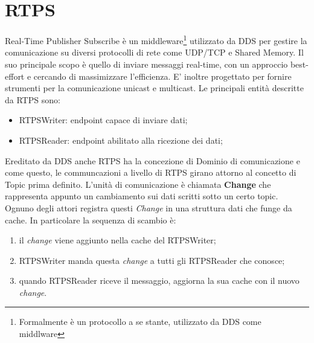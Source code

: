 \section{RTPS}
Real-Time Publisher Subscribe è un middleware\footnote{Formalmente è un protocollo a se stante, utilizzato da DDS come middlware} utilizzato da DDS per gestire la comunicazione su diversi protocolli di rete come UDP/TCP e Shared Memory. Il suo principale scopo è quello di inviare messaggi real-time, con un approccio best-effort e cercando di massimizzare l'efficienza. E' inoltre progettato per fornire strumenti per la comunicazione unicast e multicast. Le principali entità descritte da RTPS sono:
\begin{itemize}
    \item RTPSWriter: endpoint capace di inviare dati;
    \item RTPSReader: endpoint abilitato alla ricezione dei dati;
\end{itemize}
Ereditato da DDS anche RTPS ha la concezione di Dominio di comunicazione e come questo, le communcazioni a livello di RTPS girano attorno al concetto di Topic prima definito. L'unità di comunicazione è chiamata \textbf{Change} che rappresenta appunto un cambiamento sui dati scritti sotto un certo topic. Ognuno degli attori registra questi \emph{Change} in una struttura dati che funge da cache.
In particolare la sequenza di scambio è:
\begin{enumerate}
    \item il \emph{change} viene aggiunto nella cache del RTPSWriter;
    \item RTPSWriter manda questa \emph{change} a tutti gli RTPSReader che conosce;
    \item quando RTPSReader riceve il messaggio, aggiorna la sua cache con il nuovo \emph{change}.
\end{enumerate}

